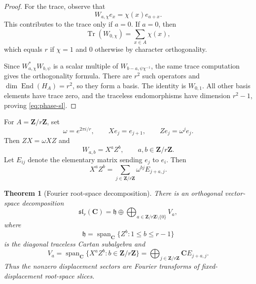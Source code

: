 \documentclass[11pt]{article}
\newcommand{\C}{\mathbf C}
\newcommand{\Z}{\mathbf Z}
\newcommand{\Tr}{\operatorname{Tr}}
\newcommand{\End}{\operatorname{End}}
\newcommand{\Span}{\operatorname{span}}
\newcommand{\1}{\mathbf 1}
\newtheorem{theorem}{Theorem}[section]
\numberwithin{equation}{section}
\begin{document}
\begin{proof}
For the trace, observe that
\begin{equation}
  W_{a,\chi}e_x=\chi(x)e_{a+x}.
\end{equation}
This contributes to the trace only if $a=0$.  If $a=0$, then
\begin{equation}
  \Tr(W_{0,\chi})=\sum_{x\in A}\chi(x),
\end{equation}
which equals $r$ if $\chi=1$ and $0$ otherwise by character orthogonality.

Since $W_{a,\chi}^*W_{b,\psi}$ is a scalar multiple of $W_{b-a,\psi\chi^{-1}}$, the same trace computation gives the orthogonality formula.  There are $r^2$ such operators and $\dim\End(H_A)=r^2$, so they form a basis.  The identity is $W_{0,1}$.  All other basis elements have trace zero, and the traceless endomorphisms have dimension $r^2-1$, proving \eqref{eq:phase-sl}.
\end{proof}

For $A=\Z/r\Z$, set
\begin{equation}
  \omega=e^{2\pi i/r},
  \qquad
  Xe_j=e_{j+1},
  \qquad
  Ze_j=\omega^j e_j.
\end{equation}
Then $ZX=\omega XZ$ and
\begin{equation}
  W_{a,b}=X^aZ^b,
  \qquad a,b\in\Z/r\Z.
\end{equation}
Let $E_{ij}$ denote the elementary matrix sending $e_j$ to $e_i$.  Then
\begin{equation}\label{eq:XaZb-elementary}
  X^aZ^b=\sum_{j\in\Z/r\Z}\omega^{bj}E_{j+a,j}.
\end{equation}

\begin{theorem}[Fourier root-space decomposition]\label{thm:fourier-root}
There is an orthogonal vector-space decomposition
\begin{equation}
  \mathfrak{sl}_r(\C)=\mathfrak h\oplus\bigoplus_{a\in\Z/r\Z\setminus\{0\}}V_a,
\end{equation}
where
\begin{equation}
  \mathfrak h=\Span_\C\{Z^b:1\le b\le r-1\}
\end{equation}
is the diagonal traceless Cartan subalgebra and
\begin{equation}
  V_a=\Span_\C\{X^aZ^b:b\in\Z/r\Z\}
  =\bigoplus_{j\in\Z/r\Z}\C E_{j+a,j}.
\end{equation}
Thus the nonzero displacement sectors are Fourier transforms of fixed-displacement root-space slices.
\end{theorem}
\end{document}
